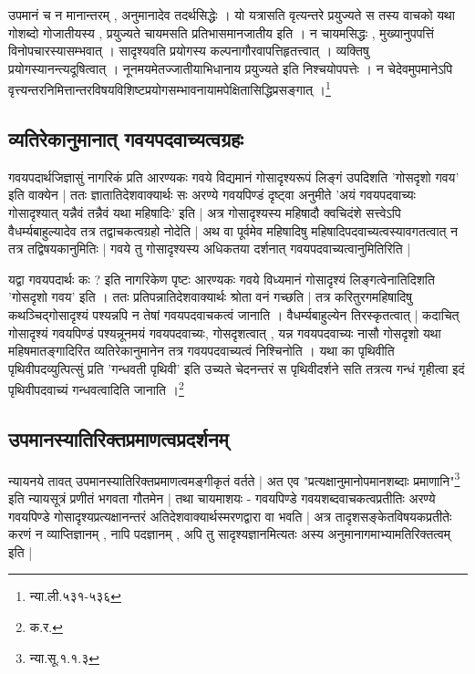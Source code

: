{\fontsize{11.7}{0}\selectfont\s उपमानं च न मानान्तरम् , अनुमानादेव तदर्थसिद्धेः । यो यत्रासति वृत्यन्तरे प्रयुज्यते स तस्य वाचको यथा गोशब्दो गोजातीयस्य , प्रयुज्यते चायमसति प्रतिभासमानजातीय इति । न चायमसिद्धः ,  मुख्यानुपपत्तिं विनोपचारस्यासम्भवात् । सादृश्यवति प्रयोगस्य कल्पनागौरवापत्तिहृतत्त्वात् । व्यक्तिषु प्रयोगस्यानन्त्यदूषित्वात् । नूनमयमेतज्जातीयाभिधानाय प्रयुज्यते इति निश्चयोपपत्तेः । न चेदेवमुपमानेऽपि वृत्त्यन्तरनिमित्तान्तरविषयविशिष्टप्रयोगसम्भावनायामपेक्षितासिद्धिप्रसङ्गात् ।\footnote{न्या.ली.५३१-५३६}}

\subsection{व्यतिरेकानुमानात् गवयपदवाच्यत्वग्रहः}

गवयपदार्थजिज्ञासुं नागरिकं प्रति आरण्यकः गवये विद्यमानं गोसादृश्यरूपं लिङ्गं उपदिशति 'गोसदृशो गवय' इति वाक्येन | ततः ज्ञातातिदेशवाक्यार्थः सः अरण्ये गवयपिण्डं दृष्ट्वा अनुमीते 'अयं गवयपदवाच्यः गोसादृश्यात् यन्नैवं तन्नैवं यथा महिषादिः' इति | अत्र गोसादृश्यस्य महिषादौ क्वचिदंशे सत्त्वेऽपि वैधर्म्यबाहुल्यादेव तत्र तद्वाचकत्वग्रहो नोदेति | अथ वा पूर्वमेव महिषादिषु महिषादिपदवाच्यत्वस्यावगतत्वात् न तत्र तद्विषयकानुमितिः | गवये तु गोसादृश्यस्य अधिकतया दर्शनात् गवयपदवाच्यत्वानुमितिरिति |

{\fontsize{11.7}{0}\selectfont\s यद्वा गवयपदार्थः कः ? इति नागरिकेण पृष्टः आरण्यकः गवये विध्यमानं गोसादृश्यं लिङ्गत्वेनातिदिशति 'गोसदृशो गवय' इति । ततः प्रतिपन्नातिदेशवाक्यार्थः श्रोता वनं गच्छति | तत्र करितुरगमहिषादिषु कथञ्चिद्गोसादृश्यं पश्यन्नपि न तेषां गवयपदवाचकत्वं जानाति । वैधर्म्यबाहुल्येन तिरस्कृतत्वात् | कदाचित् गोसादृश्यं गवयपिण्डं पश्यन्नूनमयं गवयपदवाच्यः, गोसदृशत्वात् , यन्न गवयपदवाच्यः नासौ गोसदृशो यथा महिषमातङ्गादिरित व्यतिरेकानुमानेन तत्र गवयपदवाच्यत्वं निश्चिनोति । यथा का पृथिवीति पृथिवीपदव्युत्पित्सुं प्रति 'गन्धवती पृथिवी' इति उच्यते चेदनन्तरं स पृथिवीदर्शने सति तत्रत्य गन्धं गृहीत्वा इदं पृथिवीपदवाच्यं गन्धवत्वादिति जानाति ।\footnote{क.र.}}


\subsection{उपमानस्यातिरिक्तप्रमाणत्वप्रदर्शनम्}

न्यायनये तावत् उपमानस्यातिरिक्तप्रमाणत्वमङ्गीकृतं वर्तते | अत एव {\fontsize{11.7}{0}\selectfont\s "प्रत्यक्षानुमानोपमानशब्दाः प्रमाणानि"\footnote{न्या.सू.१.१.३}} इति न्यायसूत्रं प्रणीतं भगवता गौतमेन | तथा चायमाशयः - गवयपिण्डे गवयशब्दवाचकत्वप्रतीतिः अरण्ये गवयपिण्डे गोसादृश्यप्रत्यक्षानन्तरं अतिदेशवाक्यार्थस्मरणद्वारा वा भवति | अत्र तादृशसङ्केतविषयकप्रतीतेः करणं न व्याप्तिज्ञानम् , नापि पदज्ञानम् , अपि तु सादृश्यज्ञानमित्यतः अस्य अनुमानागमाभ्यामतिरिक्तत्वम् इति |

